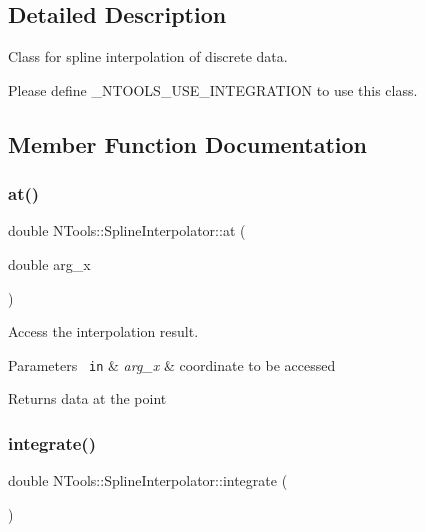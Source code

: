 \subsection{Detailed Description}
Class for spline interpolation of discrete data. 

Please define \+\_\+\+N\+T\+O\+O\+L\+S\+\_\+\+U\+S\+E\+\_\+\+I\+N\+T\+E\+G\+R\+A\+T\+I\+ON to use this class. 

\subsection{Member Function Documentation}
\mbox{\label{class_n_tools_1_1_spline_interpolator_a6c97e5781f96b2c5025cb23b3b2df27c}} 
\subsubsection{\texorpdfstring{at()}{at()}}
{\footnotesize\ttfamily double N\+Tools\+::\+Spline\+Interpolator\+::at (\begin{DoxyParamCaption}\item[{double}]{arg\+\_\+x }\end{DoxyParamCaption})}



Access the interpolation result. 


\begin{DoxyParams}[1]{Parameters}
\mbox{\texttt{ in}}  & {\em arg\+\_\+x} & coordinate to be accessed \\
\hline
\end{DoxyParams}
\begin{DoxyReturn}{Returns}
data at the point 
\end{DoxyReturn}
\mbox{\label{class_n_tools_1_1_spline_interpolator_a2551cbbe2a947b73ff22edf74351a12e}} 
\subsubsection{\texorpdfstring{integrate()}{integrate()}\hspace{0.1cm}{\footnotesize\ttfamily [1/2]}}
{\footnotesize\ttfamily double N\+Tools\+::\+Spline\+Interpolator\+::integrate (\begin{DoxyParamCaption}{ }\end{DoxyParamCaption})}



